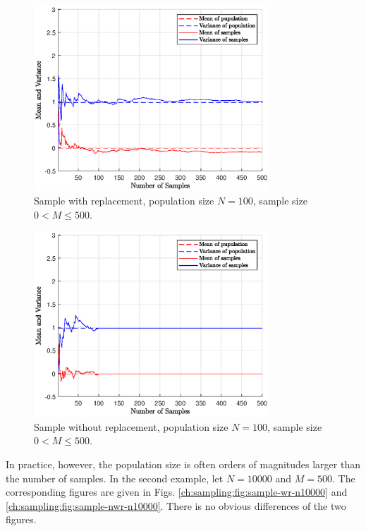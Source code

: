 \begin{figure}[!htb]
	\centering
	\includegraphics[width=250pt]{chapters/part-2/figures/sample-wr-n100.eps}
	\caption{Sample with replacement, population size $N=100$, sample size $0< M\leq500$.} \label{ch:sampling:fig:sample-wr-n100}
\end{figure}

\begin{figure}[!htb]
	\centering
	\includegraphics[width=250pt]{chapters/part-2/figures/sample-nwr-n100.eps}
	\caption{Sample without replacement, population size $N=100$, sample size $0< M\leq500$.} \label{ch:sampling:fig:sample-nwr-n100}
\end{figure}

In practice, however, the population size is often orders of magnitudes larger than the number of samples. In the second example, let $N=10000$ and $M=500$. The corresponding figures are given in Figs. \ref{ch:sampling:fig:sample-wr-n10000} and \ref{ch:sampling:fig:sample-nwr-n10000}. There is no obvious differences of the two figures.

